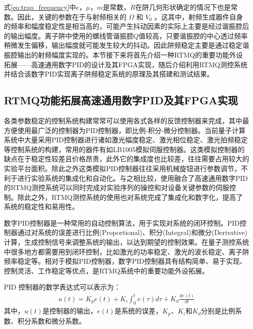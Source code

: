 式\eqref{eq:trap_frequency}中$e$，$\mu$，$m$是常数，$R$在阱几何形状确定的情况下也是常数。因此，关键的参数在于与射频相关的 $\Omega$ 和 $V_0$ 。这其中，射频生成器件自身的频率和幅度稳定性是相当高的，可能产生抖动因素的实际上主要是经过谐振腔后的输出幅度。离子阱中使用的螺线管谐振腔$Q$值较高，只要谐振腔的中心透过频率稍微发生偏移，输出幅度就可能发生较大的抖动。因此阱频稳定主要是通过稳定谐振腔输出的射频幅度实现的。本节接下来将首先介绍一种RTMQ的重要功能外设拓展——高速通用数字PID的设计及其FPGA实现，随后介绍利用RTMQ测控系统并结合该数字PID实现离子阱频稳定系统的原理及其搭建和测试结果。

\subsection[RTMQ功能拓展高速通用数字PID及其FPGA实现]{RTMQ功能拓展高速通用数字PID及其FPGA实现\label{section:digital_pid}}

各类参数稳定的控制系统构建常常可以使用各式各样的反馈控制器来完成，其中最方便使用最广泛的控制器为PID控制器，即比例-积分-微分控制器。当前量子计算系统中大量采用PID控制器进行诸如激光幅度稳定、激光相位稳定、激光拍频稳定等控制系统的构建，常用的器件有如LB1005模拟伺服控制器。这类模拟控制器的缺点在于稳定性较差且价格昂贵，此外它的集成度也比较差，往往需要占用较大的实验平台面积。除此之外这类模拟PID控制器往往采用机械旋钮进行参数调节，不利于进行实验系统的集成化和自动化。与之相比较，使用融合了高速通用数字PID的RTMQ测控系统可以同时完成对实验序列的操控和对设备关键参数的伺服控制。除此之外，RTMQ测控系统的使用也对系统完成了集成化和数字化，提高了系统的稳定性和易用性。

数字PID控制器是一种常用的自动控制算法，用于实现对系统的闭环控制。PID控制器通过对系统的误差进行比例(Proportional)、积分(Integral)和微分(Derivative)计算，生成控制信号来调整系统的输出，以达到期望的控制效果。在量子测控系统中很多地方都需要用到闭环控制，比如激光的功率稳定、激光的波长稳定、离子阱频率稳定等。相对于模拟PID控制器，数字PID控制器具有结构简单、易于实现、控制灵活、工作稳定等优点，是RTMQ系统中的重要功能外设拓展。

PID 控制器的数学表达式可以表示为：
\begin{align}
    u(t)= K_p e(t) + K_i \int_{0}^{t} e(\tau) d\tau + K_d \frac{d e(t)}{dt}
\end{align}
其中，$u(t)$是控制器的输出，$e(t)$是系统的误差，$K_p$、$K_i$和$K_d$分别是比例系数、积分系数和微分系数。
 
